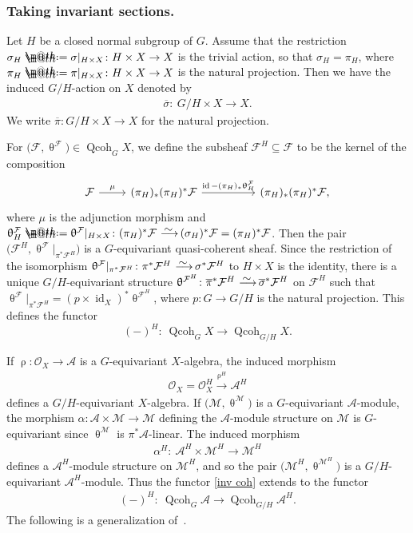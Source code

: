 \documentclass[11pt]{article}
\makeatletter
\numberwithin{equation}{section}
\newcommand*{\defeq}{\mathrel{\rlap{%
 \raisebox{0.3ex}{$\m@th\cdot$}}%
 \raisebox{-0.3ex}{$\m@th\cdot$}}%
 =}
\numberwithin{equation}{section}
\newcommand{\Qcoh}{\operatorname{Qcoh}}
\newcommand{\id}{\operatorname{id}}
\newcommand{\cA}{\mathcal{A}}
\newcommand{\cF}{\mathcal{F}}
\newcommand{\cM}{\mathcal{M}}
\newcommand{\cO}{\mathcal{O}}
\newcommand{\simto}{\,\,\,\,\raisebox{4pt}{$\sim$}{\kern -1.1em \longrightarrow}\,}
\makeatother
\begin{document}
\subsubsection{Taking invariant sections.}
Let $H$ be a closed normal subgroup of $G$. Assume that the restriction $\sigma_H\defeq\sigma|_{H\times X}\colon H\times X\to X$ is the trivial action, so that $\sigma_H=\pi_H$, where $\pi_H\defeq\pi|_{H\times X}\colon H\times X\to X$ is the natural projection. Then we have the induced $G/H$-action on $X$ denoted by
\begin{gather*}
\overline{\sigma}\colon\ G/H\times X\to X.
\end{gather*}
We write $\overline{\pi}\colon G/H\times X\to X$ for the natural projection.

For $\big(\cF,\uptheta^{\cF}\big)\in\Qcoh_GX$, we define the subsheaf $\cF^H\subseteq\cF$ to be the kernel of the composition
\[
\begin{tikzcd}
\cF\arrow[r,"\mu"]&(\pi_H)_*(\pi_H)^* \cF\arrow[rr,"\id -(\pi_H)_*\uptheta_H^{\cF}"]&&(\pi_H)_*(\pi_H)^* \cF,
\end{tikzcd}
\]
 where $\mu$ is the adjunction morphism and $\uptheta^{\cF}_H\defeq\uptheta^{\cF}|_{H\times X}\colon (\pi_H)^*\cF\simto (\sigma_H)^*\cF=(\pi_H)^*\cF$.
Then the pair $\big(\cF^H,\uptheta^{\cF}|_{\pi^*\cF^H}\big)$ is a $G$-equivariant quasi-coherent sheaf. Since the restriction of the isomorphism $\uptheta^{\cF}|_{\pi^*\cF^H}\colon {\pi^*\cF^H}\simto {\sigma^*\cF^H}$ to $H\times X$ is the identity, there is a unique $G/H$-equivariant structure $\uptheta^{\cF^H}\colon \overline{\pi}^*\cF^H\simto \overline{\sigma}^*\cF^H$ on $\cF^H$ such that $\uptheta^{\cF}|_{\pi^*\cF^H}={(p\times \id _X)}^*\uptheta^{\cF^H}$, where $p\colon G\to G/H$ is the natural projection. This defines the functor
\begin{equation}\label{inv coh}
(-)^H\colon\ \Qcoh_GX\to \Qcoh_{G/H}X.
\end{equation}

If $\uprho\colon\cO_X\to\cA$ is a $G$-equivariant $X$-algebra, the induced morphism
\begin{gather*}
\cO_X=\cO_X^H\xrightarrow{\uprho^H}\cA^H
\end{gather*}
defines a $G/H$-equivariant $X$-algebra. If $\big(\cM,\uptheta^{\cM}\big)$ is a $G$-equivariant $\cA$-module, the morphism $\alpha\colon \cA\times \cM\to \cM$ defining the $\cA$-module structure on $\cM$ is $G$-equivariant since $\uptheta^{\cM}$ is $\pi^*\cA$-linear. The induced morphism
\begin{gather*}
\alpha^H\colon\ \cA^H\times \cM^H\to \cM^H
\end{gather*}
 defines a $\cA^H$-module structure on $\cM^H$, and so the pair $\big(\cM^H,\uptheta^{\cM^H}\big)$ is a $G/H$-equivariant $\cA^H$-module. Thus the functor \eqref{inv coh} extends to the functor
\begin{gather*}
(-)^H\colon\ \Qcoh_G\cA\to \Qcoh_{G/H}\cA^H.
\end{gather*}
The following is a generalization of~\cite[Lemma~2.22]{bfk}.
\end{document}
